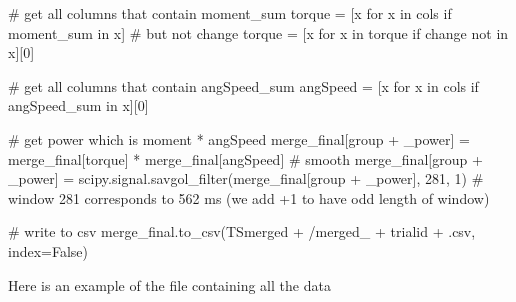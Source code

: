 \documentclass[
  letterpaper,
  DIV=11,
  numbers=noendperiod]{scrreprt}
\newenvironment{Shaded}{\begin{snugshade}}{\end{snugshade}}
\newcommand{\CommentTok}[1]{\textcolor[rgb]{0.37,0.37,0.37}{#1}}
\newcommand{\ControlFlowTok}[1]{\textcolor[rgb]{0.00,0.23,0.31}{#1}}
\newcommand{\DecValTok}[1]{\textcolor[rgb]{0.68,0.00,0.00}{#1}}
\newcommand{\KeywordTok}[1]{\textcolor[rgb]{0.00,0.23,0.31}{#1}}
\newcommand{\NormalTok}[1]{\textcolor[rgb]{0.00,0.23,0.31}{#1}}
\newcommand{\OperatorTok}[1]{\textcolor[rgb]{0.37,0.37,0.37}{#1}}
\newcommand{\StringTok}[1]{\textcolor[rgb]{0.13,0.47,0.30}{#1}}
\newcommand{\VariableTok}[1]{\textcolor[rgb]{0.07,0.07,0.07}{#1}}
\begin{document}
\begin{Shaded}
\begin{Highlighting}[]
        \CommentTok{\# get all columns that contain \textquotesingle{}moment\_sum\textquotesingle{}}
\NormalTok{        torque }\OperatorTok{=}\NormalTok{ [x }\ControlFlowTok{for}\NormalTok{ x }\KeywordTok{in}\NormalTok{ cols }\ControlFlowTok{if} \StringTok{\textquotesingle{}moment\_sum\textquotesingle{}} \KeywordTok{in}\NormalTok{ x]}
        \CommentTok{\# but not change}
\NormalTok{        torque }\OperatorTok{=}\NormalTok{ [x }\ControlFlowTok{for}\NormalTok{ x }\KeywordTok{in}\NormalTok{ torque }\ControlFlowTok{if} \StringTok{\textquotesingle{}change\textquotesingle{}} \KeywordTok{not} \KeywordTok{in}\NormalTok{ x][}\DecValTok{0}\NormalTok{]}

        \CommentTok{\# get all columns that contain \textquotesingle{}angSpeed\_sum\textquotesingle{}}
\NormalTok{        angSpeed }\OperatorTok{=}\NormalTok{ [x }\ControlFlowTok{for}\NormalTok{ x }\KeywordTok{in}\NormalTok{ cols }\ControlFlowTok{if} \StringTok{\textquotesingle{}angSpeed\_sum\textquotesingle{}} \KeywordTok{in}\NormalTok{ x][}\DecValTok{0}\NormalTok{]}

        \CommentTok{\# get power which is moment * angSpeed}
\NormalTok{        merge\_final[group }\OperatorTok{+} \StringTok{\textquotesingle{}\_power\textquotesingle{}}\NormalTok{] }\OperatorTok{=}\NormalTok{ merge\_final[torque] }\OperatorTok{*}\NormalTok{ merge\_final[angSpeed]}
        \CommentTok{\# smooth}
\NormalTok{        merge\_final[group }\OperatorTok{+} \StringTok{\textquotesingle{}\_power\textquotesingle{}}\NormalTok{] }\OperatorTok{=}\NormalTok{ scipy.signal.savgol\_filter(merge\_final[group }\OperatorTok{+} \StringTok{\textquotesingle{}\_power\textquotesingle{}}\NormalTok{], }\DecValTok{281}\NormalTok{, }\DecValTok{1}\NormalTok{) }\CommentTok{\# window 281 corresponds to 562 ms (we add +1 to have odd length of window)}
    
    \CommentTok{\# write to csv}
\NormalTok{    merge\_final.to\_csv(TSmerged }\OperatorTok{+} \StringTok{\textquotesingle{}/merged\_\textquotesingle{}} \OperatorTok{+}\NormalTok{ trialid }\OperatorTok{+} \StringTok{\textquotesingle{}.csv\textquotesingle{}}\NormalTok{, index}\OperatorTok{=}\VariableTok{False}\NormalTok{)  }
\end{Highlighting}
\end{Shaded}

Here is an example of the file containing all the data
\end{document}
